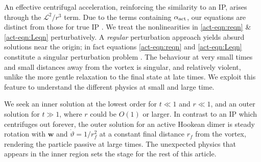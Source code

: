 \documentclass[../Rajarshi-thesis-draft.tex]{subfiles}
\begin{document}
An effective centrifugal acceleration, reinforcing the similarity to an IP, arises through the $\mathscr{L}^2/r^3$ term. Due to the terms containing $\alpha_{\rm act}$, our equations are distinct from those for true IP \cite{Croor2015}. We treat the nonlinearities in \eqref{act-eqn:reqn} \& \eqref{act-eqn:Leqn} perturbatively. A \textit{regular} perturbation approach yields absurd solutions near the origin; in fact equations \eqref{act-eqn:reqn} and \eqref{act-eqn:Leqn} constitute a singular perturbation problem \cite{BO1999}.
The behaviour at very small times and small distances away from the vortex is singular, and relatively violent, unlike the more gentle relaxation to the final state at late times. We exploit this feature to understand the different physics at small and large time.

We seek an inner solution at the lowest order for $t\ll 1$ and $r\ll 1$, and an outer solution for $t\gg1$, where $r$ could be $O(1)$ or larger. In contrast to an IP which centrifuges out forever, the outer solution for an active Hookean dimer is steady rotation with $\mathbf{w}$ and $\dot\vartheta=1/r_f^2$ at a constant final distance $r_f$ from the vortex, rendering the particle passive at large times. The unexpected physics that appears in the inner region sets the stage for the rest of this article. 
\end{document}
